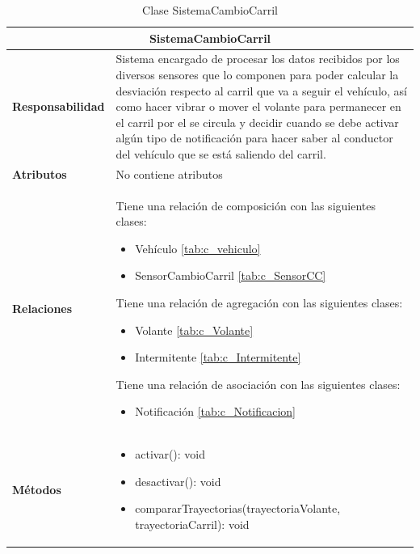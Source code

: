 \begin{table}[H]
\begin{center}
\begin{tabular}{p{} p{11cm}}
\multicolumn{2}{c}{\textbf{SistemaCambioCarril} } \\ \hline \hline
\textbf{Responsabilidad} &  Sistema encargado de procesar los datos recibidos por los diversos sensores que lo componen para poder calcular la desviación respecto al carril que va a seguir el vehículo, así como hacer vibrar o mover el volante para permanecer en el carril por el se circula y decidir cuando se debe activar algún tipo de notificación para hacer saber al conductor del vehículo que se está saliendo del carril. \\ \hline
\textbf{Atributos} & No contiene atributos
                      \\ \hline
\textbf{Relaciones} &

                      \par Tiene una relación de composición con las siguientes clases:
                      \begin{itemize}
                        \item Vehículo \ref{tab:c_vehiculo}
                        \item SensorCambioCarril \ref{tab:c_SensorCC}
                      \end{itemize}

                      \par Tiene una relación de agregación con las siguientes clases:
                        \begin{itemize}
                          \item Volante \ref{tab:c_Volante}
                          \item Intermitente \ref{tab:c_Intermitente}
                        \end{itemize}

                        \par Tiene una relación de asociación con las siguientes clases:
                        \begin{itemize}
                          \item Notificación \ref{tab:c_Notificacion}
                        \end{itemize}

                      \\ \hline

\textbf{Métodos} &  \begin{itemize}
                      \item activar(): void
                      \item desactivar(): void
                      \item compararTrayectorias(trayectoriaVolante, trayectoriaCarril): void
                    \end{itemize}\\ \hline
\end{tabular}
\caption{Clase SistemaCambioCarril}
\label{tab:c_SCarril}
\end{center}
\end{table}
